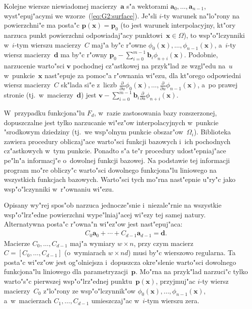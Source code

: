 Kolejne wiersze niewiadomej macierzy~$\bm{a}$ s"a wektorami
$\bm{a}_0,\ldots,\bm{a}_{n-1}$, wyst"epuj"acymi we
wzorze~(\ref{eq:G2:surface}). Je"sli $i$-ty warunek na"lo"rony na powierzchni"e
ma posta"c $\bm{p}(\bm{x})=\bm{p}_0$ (to jest warunek interpolacyjny, kt"ory
narzuca punkt powierzchni odpowiadaj"acy punktowi~$\bm{x}\in\varOmega$), to
wsp"o"lczynniki w~$i$-tym wierszu macierzy~$C$ maj"a by"c r"owne
$\phi_0(\bm{x}),\ldots,\phi_{n-1}(\bm{x})$, a~$i$-ty wiersz
macierzy~$\bm{d}$ ma by"c r"owny
$\bm{p}_0-\sum_{i=0}^{m-1}\bm{b}_i\phi_{n+i}(\bm{x})$. Podobnie, narzucenie
warto"sci $\bm{v}$ pochodnej cz"astkowej na przyk"lad ze wzgl"edu na~$u$
w~punkcie~$\bm{x}$ nast"epuje za pomoc"a r"ownania wi"ezu, dla kt"orego
odpowiedni wiersz macierzy~$C$ sk"lada si"e z~liczb
$\frac{\partial}{\partial u}\phi_0(\bm{x}),\ldots,%
\frac{\partial}{\partial u}\phi_{n-1}(\bm{x})$, a~po prawej stronie
(tj.\ w~macierzy~$\bm{d}$) jest $\bm{v}-\sum_{i=0}^{m-1}\bm{b}_i%
\frac{\partial}{\partial u}\phi_{n+i}(\bm{x})$.

W~przypadku funkcjona"lu $F_d$, w~razie zastosowania bazy rozszerzonej,
dopuszczalne jest tylko narzucanie wi"ez"ow interpolacyjnych w~punkcie
"srodkowym dziedziny (tj.\ we wsp"olnym punkcie obszar"ow~$\varOmega_i$).
Biblioteka zawiera procedury obliczaj"ace warto"sci funkcji bazowych i~ich
pochodnych cz"astkowych w~tym punkcie. Ponadto s"a te"r procedury
udost"epniaj"ace pe"ln"a informacj"e o~dowolnej funkcji bazowej. Na
podstawie tej informacji program mo"re obliczy"c warto"sci dowolnego
funkcjona"lu liniowego na wszystkich funkcjach bazowych. Warto"sci tych
mo"rna nast"epnie u"ry"c jako wsp"o"lczynniki w~r"ownaniu wi"ezu.

\vspace{\medskipamount}
Opisany wy"rej spos"ob narzuca jednocze"snie i~niezale"rnie na wszystkie
wsp"o"lrz"edne po\-wierzch\-ni wype"lniaj"acej wi"ezy tej samej natury.
Alternatywna posta"c r"owna"n wi"ez"ow jest nast"epuj"aca:
\begin{align}\label{eq:alt:constraints}
  C_0\bm{a}_0+\cdots+C_{d-1}\bm{a}_{d-1} = \bm{d}.
\end{align}
Macierze $C_0,\ldots,C_{d-1}$ maj"a wymiary $w\times n$, przy czym
macierz~$C=[C_0,\ldots,C_{d-1}]$ (o~wymiarach $w\times nd$) musi by"c
wierszowo regularna. Ta posta"c wi"ez"ow jest og"olniejsza i~dopuszcza
okre"slenie warto"sci dowolnego funkcjona"lu liniowego dla
parametryzacji~$\bm{p}$. Mo"rna na przyk"lad narzuci"c tylko warto"s"c
pierwszej wsp"o"lrz"ednej punktu~$\bm{p}(\bm{x})$, przyjmuj"ac $i$-ty wiersz
macierzy~$C_0$ z"lo"rony ze wsp"o"lczynnik"ow
$\phi_0(\bm{x}),\ldots,\phi_{n-1}(\bm{x})$,
a~w~macierzach $C_1,\ldots,C_{d-1}$ umieszczaj"ac w~$i$-tym wierszu zera.


